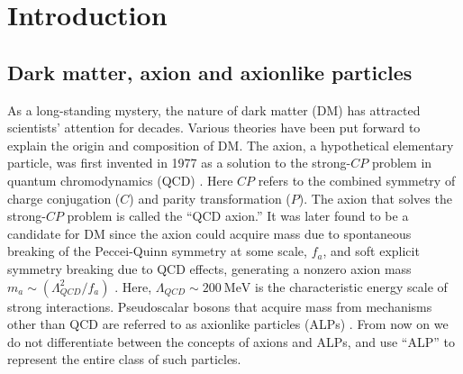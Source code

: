 \documentclass{WileyMSP-template}
\newcommand{\DK}[1]{\textcolor{brown}{Derek: #1}}
\begin{document}
	
	\section{Introduction}\label{sec:introduction}

	\subsection{Dark matter, axion and axionlike particles}

	As a long-standing mystery, the nature of dark matter (DM) has attracted scientists' attention for decades. Various theories have been put forward to explain the origin and composition of DM. 
	The axion, a hypothetical elementary particle, was first invented in 1977 as a solution to the strong-$CP$ problem in quantum chromodynamics (QCD) \cite{IRASTORZA201889, Peccei_PhysRevLett.38.1440, Weinberg_PhysRevLett.40.223, Wilczek_PhysRevLett.40.279, DeMille_doi:10.1126/science.aal3003}.
	Here $CP$ refers to the combined symmetry of charge conjugation ($C$) and parity transformation ($P$). 
	The axion that solves the strong-$CP$ problem is called the ``QCD axion.'' 
	It was later found to be a candidate for DM since the axion could acquire mass %
	due to spontaneous breaking of the Peccei-Quinn symmetry at some scale, $f_a$, and soft explicit symmetry breaking due to QCD effects, 
	generating a nonzero axion mass $m_a \sim (\Lambda_{QCD}^2/f_a)$ \cite{Kimball2022search}. 
	Here, $\Lambda_{QCD}\sim \SI{200}{\MeV}$ \cite{Dzuba_2002_PhysRevA, Baldicchi_2007_PhysRevLett} is the characteristic energy scale of strong interactions. Pseudoscalar bosons that acquire mass from mechanisms other than QCD are referred to as axionlike particles (ALPs) \cite{IRASTORZA201889, Graham_doi:10.1146/annurev-nucl-102014-022120, Sikivie_RevModPhys.93.015004}. From now on we do not differentiate between the concepts of axions and ALPs, and use ``ALP'' to represent the entire class of such particles. 
\end{document}
